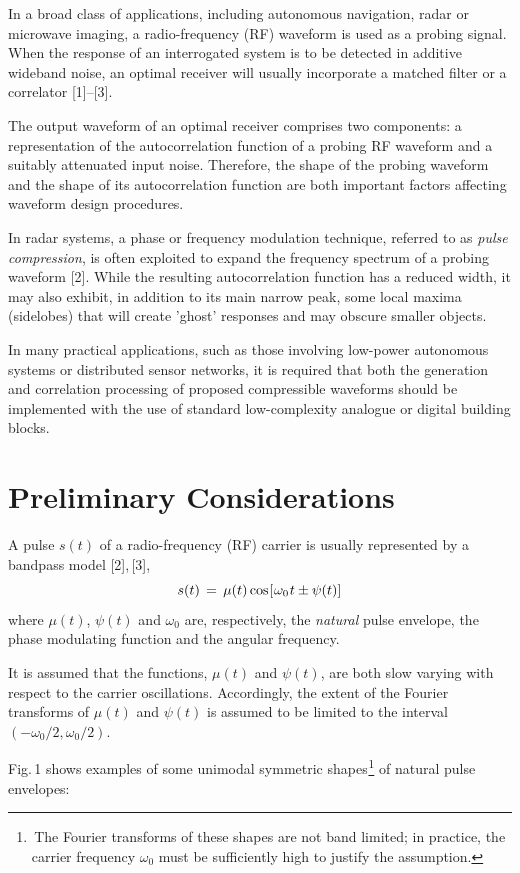 \documentclass[journal]{IEEEtran}
\begin{document}
In a broad class of applications, including autonomous navigation, radar or microwave imaging, a radio-frequency (RF) waveform is used as a probing signal. When the response of an interrogated system is to be detected in additive wideband noise, an optimal receiver will usually incorporate a matched filter or a correlator [1]--[3]. 

The output waveform of an optimal receiver comprises two components: a representation of the autocorrelation function of a probing RF waveform and a suitably attenuated input noise. Therefore, the shape of the probing waveform and the shape of its autocorrelation function are both important factors affecting waveform design procedures. 

In radar systems, a phase or frequency modulation technique, referred to as {\emph {pulse compression}}, is often exploited to expand the frequency spectrum of a probing waveform [2]. While the resulting autocorrelation function has a reduced width, it may also exhibit, in addition to its main narrow peak, some local maxima (sidelobes) that will create 'ghost' responses and may  obscure smaller objects.

In many practical applications, such as those involving low-power autonomous systems or distributed sensor networks, it is required that both the generation and correlation processing of proposed compressible waveforms should be implemented with the use of standard low-complexity analogue or digital building blocks.

\section{Preliminary Considerations}
A pulse $s(t)$ of a radio-frequency (RF) carrier is usually represented 
by a bandpass model [2],\,[3],
\begin{equation}
	s(t) \,=\, \mu(t) \cos \mspace{-2mu}
	\left[   \mspace{1mu}           \omega_0\mspace{1mu}t \pm \psi(t) \right]
\end{equation}
where $\mu(t)$, $\psi(t)$ and $\omega_0$ are, respectively, the {\emph {natural}} 
pulse envelope, the phase modulating function and the angular frequency. 

It is assumed that the functions, $\mu(t)$ and $\psi(t)$, are both slow varying with respect to the carrier oscillations. Accordingly, the extent of the Fourier transforms of $\mu(t)$ and $\psi(t)$ is assumed to be limited to the interval $(-\omega_0/2,\omega_0/2)$.

Fig.\,1 shows examples of some unimodal symmetric shapes$\mspace{1mu}${\footnote {\,The Fourier transforms of these shapes are not band limited; in practice, the carrier frequency $\omega_0$ must be sufficiently high to justify the assumption.}} of natural pulse envelopes:
\end{document}
